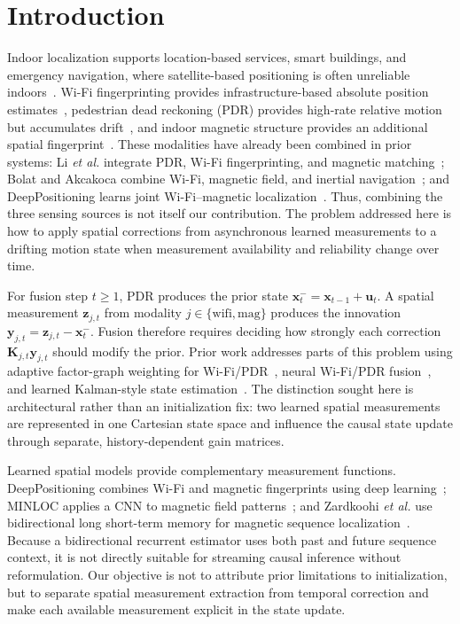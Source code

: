 \documentclass[conference]{IEEEtran}
\begin{document}
\section{Introduction}

Indoor localization supports location-based services, smart buildings, and emergency navigation, where satellite-based positioning is often unreliable indoors~\cite{radar}. Wi-Fi fingerprinting provides infrastructure-based absolute position estimates~\cite{horus}, pedestrian dead reckoning (PDR) provides high-rate relative motion but accumulates drift~\cite{nnwifipdr}, and indoor magnetic structure provides an additional spatial fingerprint~\cite{overviewdatasets}. These modalities have already been combined in prior systems: Li \emph{et al.} integrate PDR, Wi-Fi fingerprinting, and magnetic matching~\cite{li2016hybrid}; Bolat and Akcakoca combine Wi-Fi, magnetic field, and inertial navigation~\cite{hybridwifi}; and DeepPositioning learns joint Wi-Fi--magnetic localization~\cite{deeppos}. Thus, combining the three sensing sources is not itself our contribution. The problem addressed here is how to apply spatial corrections from asynchronous learned measurements to a drifting motion state when measurement availability and reliability change over time.

For fusion step $t\geq 1$, PDR produces the prior state $\mathbf{x}_{t}^{-}=\mathbf{x}_{t-1}+\mathbf{u}_{t}$. A spatial measurement $\mathbf{z}_{j,t}$ from modality $j\in\{\mathrm{wifi},\mathrm{mag}\}$ produces the innovation $\mathbf{y}_{j,t}=\mathbf{z}_{j,t}-\mathbf{x}_{t}^{-}$. Fusion therefore requires deciding how strongly each correction $\mathbf{K}_{j,t}\mathbf{y}_{j,t}$ should modify the prior. Prior work addresses parts of this problem using adaptive factor-graph weighting for Wi-Fi/PDR~\cite{wang2020factorgraph}, neural Wi-Fi/PDR fusion~\cite{nnwifipdr}, and learned Kalman-style state estimation~\cite{kalmannet}. The distinction sought here is architectural rather than an initialization fix: two learned spatial measurements are represented in one Cartesian state space and influence the causal state update through separate, history-dependent gain matrices.

Learned spatial models provide complementary measurement functions. DeepPositioning combines Wi-Fi and magnetic fingerprints using deep learning~\cite{deeppos}; MINLOC applies a CNN to magnetic field patterns~\cite{minloc}; and Zardkoohi \emph{et al.} use bidirectional long short-term memory for magnetic sequence localization~\cite{bilstmmag}. Because a bidirectional recurrent estimator uses both past and future sequence context, it is not directly suitable for streaming causal inference without reformulation. Our objective is not to attribute prior limitations to initialization, but to separate spatial measurement extraction from temporal correction and make each available measurement explicit in the state update.
\end{document}
